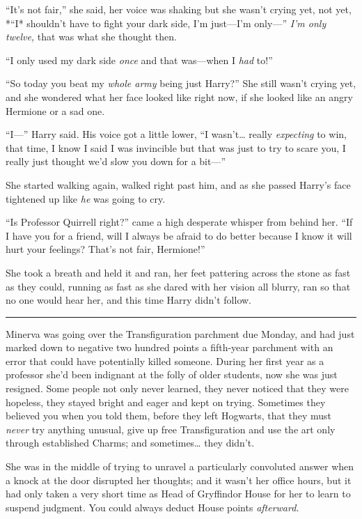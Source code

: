 ``It's not fair,'' she said, her voice was shaking but she wasn't crying
yet, not yet, *``I* shouldn't have to fight your dark side, I'm
just---I'm only---'' \emph{I'm only twelve,} that was what she thought
then.

``I only used my dark side \emph{once} and that was---when I \emph{had}
to!''

``So today you beat my \emph{whole army} being just Harry?'' She still
wasn't crying yet, and she wondered what her face looked like right now,
if she looked like an angry Hermione or a sad one.

``I---'' Harry said. His voice got a little lower, ``I wasn't\ldots{}
really \emph{expecting} to win, that time, I know I said I was
invincible but that was just to try to scare you, I really just thought
we'd slow you down for a bit---''

She started walking again, walked right past him, and as she passed
Harry's face tightened up like \emph{he} was going to cry.

``Is Professor Quirrell right?'' came a high desperate whisper from
behind her. ``If I have you for a friend, will I always be afraid to do
better because I know it will hurt your feelings? That's not fair,
Hermione!''

She took a breath and held it and ran, her feet pattering across the
stone as fast as they could, running as fast as she dared with her
vision all blurry, ran so that no one would hear her, and this time
Harry didn't follow.

\begin{center}\rule{3in}{0.4pt}\end{center}

Minerva was going over the Transfiguration parchment due Monday, and had
just marked down to negative two hundred points a fifth-year parchment
with an error that could have potentially killed someone. During her
first year as a professor she'd been indignant at the folly of older
students, now she was just resigned. Some people not only never learned,
they never noticed that they were hopeless, they stayed bright and eager
and kept on trying. Sometimes they believed you when you told them,
before they left Hogwarts, that they must \emph{never} try anything
unusual, give up free Transfiguration and use the art only through
established Charms; and sometimes\ldots{} they didn't.

She was in the middle of trying to unravel a particularly convoluted
answer when a knock at the door disrupted her thoughts; and it wasn't
her office hours, but it had only taken a very short time as Head of
Gryffindor House for her to learn to suspend judgment. You could always
deduct House points \emph{afterward.}

